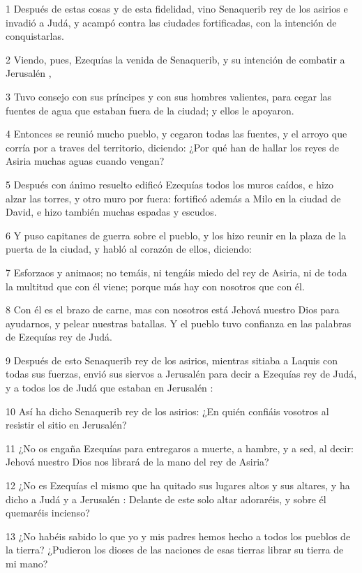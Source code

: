 \par 1 Después de estas cosas y de esta fidelidad, vino Senaquerib rey de los asirios e invadió a Judá, y acampó contra las ciudades fortificadas, con la intención de conquistarlas.
\par 2 Viendo, pues, Ezequías la venida de Senaquerib, y su intención de combatir a Jerusalén ,
\par 3 Tuvo consejo con sus príncipes y con sus hombres valientes, para cegar las fuentes de agua que estaban fuera de la ciudad; y ellos le apoyaron.
\par 4 Entonces se reunió mucho pueblo, y cegaron todas las fuentes, y el arroyo que corría por a traves del territorio, diciendo: ¿Por qué han de hallar los reyes de Asiria muchas aguas cuando vengan?
\par 5 Después con ánimo resuelto edificó Ezequías todos los muros caídos, e hizo alzar las torres, y otro muro por fuera: fortificó además a Milo en la ciudad de David, e hizo también muchas espadas y escudos.
\par 6 Y puso capitanes de guerra sobre el pueblo, y los hizo reunir en la plaza de la puerta de la ciudad, y habló al corazón de ellos, diciendo:
\par 7 Esforzaos y animaos; no temáis, ni tengáis miedo del rey de Asiria, ni de toda la multitud que con él viene; porque más hay con nosotros que con él.
\par 8 Con él es el brazo de carne, mas con nosotros está Jehová nuestro Dios para ayudarnos, y pelear nuestras batallas. Y el pueblo tuvo confianza en las palabras de Ezequías rey de Judá.
\par 9 Después de esto Senaquerib rey de los asirios, mientras sitiaba a Laquis con todas sus fuerzas, envió sus siervos a Jerusalén para decir a Ezequías rey de Judá, y a todos los de Judá que estaban en Jerusalén :
\par 10 Así ha dicho Senaquerib rey de los asirios: ¿En quién confiáis vosotros al resistir el sitio en Jerusalén?
\par 11 ¿No os engaña Ezequías para entregaros a muerte, a hambre, y a sed, al decir: Jehová nuestro Dios nos librará de la mano del rey de Asiria?
\par 12 ¿No es Ezequías el mismo que ha quitado sus lugares altos y sus altares, y ha dicho a Judá y a Jerusalén : Delante de este solo altar adoraréis, y sobre él quemaréis incienso?
\par 13 ¿No habéis sabido lo que yo y mis padres hemos hecho a todos los pueblos de la tierra? ¿Pudieron los dioses de las naciones de esas tierras librar su tierra de mi mano?
